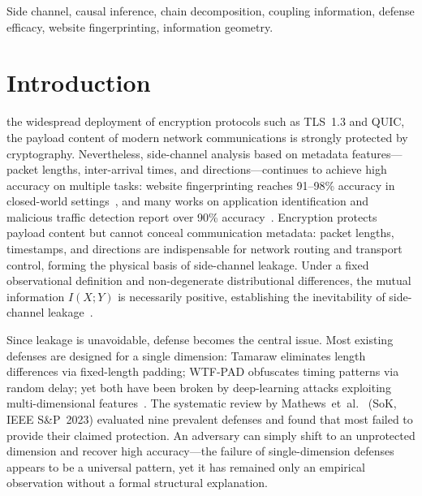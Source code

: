 \documentclass[lettersize,journal]{IEEEtran}
\begin{document}
\begin{IEEEkeywords}
Side channel, causal inference, chain decomposition, coupling
information, defense efficacy, website fingerprinting, information
geometry.
\end{IEEEkeywords}

\section{Introduction}

 the widespread deployment of encryption protocols
such as TLS~1.3 and QUIC, the payload content of modern network
communications is strongly protected by cryptography.
Nevertheless, side-channel analysis based on metadata features---packet
lengths, inter-arrival times, and directions---continues to achieve high
accuracy on multiple tasks: website fingerprinting reaches
91--98\% accuracy in closed-world settings~\cite{wang2014effective,sirinam2018deep},
and many works on application identification and malicious traffic
detection report over 90\% accuracy~\cite{shen2021graphdapp,lin2022etbert}.
Encryption protects payload content but cannot conceal communication
metadata: packet lengths, timestamps, and directions are indispensable
for network routing and transport control, forming the physical basis of
side-channel leakage.
Under a fixed observational definition and non-degenerate distributional
differences, the mutual information $I(X;Y)$ is necessarily positive,
establishing the inevitability of side-channel
leakage~\cite{liu2026inevitability}.

Since leakage is unavoidable, defense becomes the central issue.
Most existing defenses are designed for a single dimension: Tamaraw
eliminates length differences via fixed-length padding; WTF-PAD
obfuscates timing patterns via random delay; yet both have been broken by
deep-learning attacks exploiting multi-dimensional
features~\cite{sirinam2018deep}.
The systematic review by Mathews~et~al.~\cite{mathews2023sok}
(SoK, IEEE S\&P~2023) evaluated nine prevalent defenses and found that
most failed to provide their claimed protection.
An adversary can simply shift to an unprotected dimension and recover
high accuracy---the failure of single-dimension defenses appears to be a
universal pattern, yet it has remained only an empirical observation
without a formal structural explanation.
\end{document}
